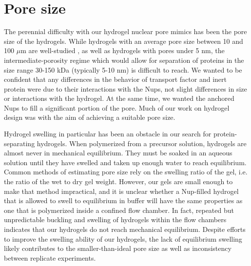 
\section{Pore size}
\label{sec:pore-size}

The perennial difficulty with our hydrogel nuclear pore mimics has been the pore size of the hydrogels. While hydrogels with an average pore size between 10 and 100 $\mu$m are well-studied \cite{annabi10}, as well as hydrogels with pores under 5 nm, the intermediate-porosity regime which would allow for separation of proteins in the size range 30-150 kDa (typically 5-10 nm) is difficult to reach.  We wanted to be confident that any differences in the behavior of transport factor and inert protein were due to their interactions with the Nups, not slight differences in size or interactions with the hydrogel.  At the same time, we wanted the anchored Nups to fill a significant portion of the pore.  Much of our work on hydrogel design was with the aim of achieving a suitable pore size.

Hydrogel swelling in particular has been an obstacle in our search for protein-separating hydrogels.  When polymerized from a precursor solution, hydrogels are almost never in mechanical equilibrium.  They must be soaked in an aqueous solution until they have swelled and taken up enough water to reach equilibrium.  Common methods of estimating pore size rely on the swelling ratio of the gel, i.e. the ratio of the wet to dry gel weight.  However, our gels are small enough to make that method impractical, and it is unclear whether a Nup-filled hydrogel that is allowed to swell to equilibrium in buffer will have the same properties as one that is polymerized inside a confined flow chamber.  In fact, repeated but unpredictable buckling and swelling of hydrogels within the flow chambers indicates that our hydrogels do not reach mechanical equilibrium.  Despite efforts to improve the swelling ability of our hydrogels, the lack of equilibrium swelling likely contributes to the smaller-than-ideal pore size as well as inconsistency between replicate experiments.


